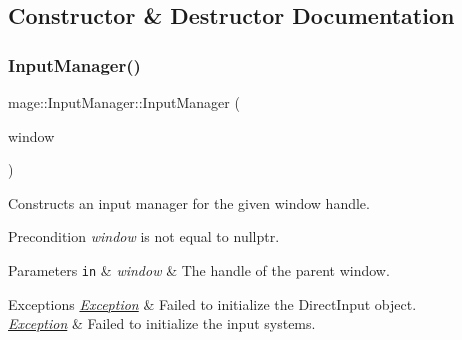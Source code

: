 \subsection{Constructor \& Destructor Documentation}
\hypertarget{classmage_1_1_input_manager_a23cc1e28f376a126a4dfe606efe2824d}{}\label{classmage_1_1_input_manager_a23cc1e28f376a126a4dfe606efe2824d} 
\subsubsection{\texorpdfstring{Input\+Manager()}{InputManager()}\hspace{0.1cm}{\footnotesize\ttfamily [1/3]}}
{\footnotesize\ttfamily mage\+::\+Input\+Manager\+::\+Input\+Manager (\begin{DoxyParamCaption}\item[{H\+W\+ND}]{window }\end{DoxyParamCaption})\hspace{0.3cm}{\ttfamily [explicit]}}

Constructs an input manager for the given window handle.

\begin{DoxyPrecond}{Precondition}
{\itshape window} is not equal to {\ttfamily nullptr}. 
\end{DoxyPrecond}

\begin{DoxyParams}[1]{Parameters}
\mbox{\tt in}  & {\em window} & The handle of the parent window. \\
\hline
\end{DoxyParams}

\begin{DoxyExceptions}{Exceptions}
{\em \hyperlink{classmage_1_1_exception}{Exception}} & Failed to initialize the Direct\+Input object. \\
\hline
{\em \hyperlink{classmage_1_1_exception}{Exception}} & Failed to initialize the input systems. \\
\hline
\end{DoxyExceptions}
\hypertarget{classmage_1_1_input_manager_a43ef7028cce3be1c7e48067810638e69}{}\label{classmage_1_1_input_manager_a43ef7028cce3be1c7e48067810638e69} 
